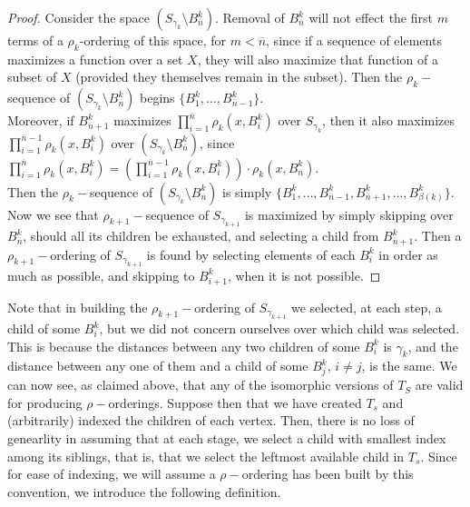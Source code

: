 \begin{proof}
Consider the space $(S_{\gamma_k} \setminus B^k_{\overline{n}})$. Removal of $B^k_{\overline{n}}$ will not effect the first $m$ terms of a $\rho_k$-ordering of this space, for $m < \overline{n}$, since if a sequence of elements maximizes a function over a set $X$, they will also maximize that function of a subset of $X$ (provided they themselves remain in the subset). Then the $\rho_k-$sequence of $(S_{\gamma_k} \setminus B^k_{\overline{n}})$ begins $\{B^k_1,\ldots, B^k_{\overline{n}-1}\}$.\\

Moreover, if $B^k_{\overline{n}+1}$ maximizes $\prod^{\overline{n}}_{i=1} \rho_{k}(x, B^k_i)$ over $S_{\gamma_k}$, then it also maximizes $\prod^{\overline{n}-1}_{i=1} \rho_{k}(x, B^k_i)$ over $(S_{\gamma_k} \setminus B^k_{\overline{n}})$, since $\prod^{\overline{n}}_{i=1} \rho_{k}(x, B^k_i) = (\prod^{\overline{n}-1}_{i=1} \rho_{k}(x, B^k_i)) \cdot \rho_{k}(x, B^k_{\overline{n}})$.\\

Then the $\rho_k-$sequence of  $(S_{\gamma_k}\setminus B^k_{\overline{n}})$ is simply $\{B^k_1,\ldots, B^k_{\overline{n}-1}, B^k_{\overline{n}+1},\ldots, B^k_{\beta(k)}\}$.\\

Now we see that $\rho_{k+1}-$sequence of $S_{\gamma_{k+1}}$ is maximized by simply skipping over $B^k_{\overline{n}}$, should all its children be exhausted, and selecting a child from $B^k_{\overline{n}+1}$. Then a $\rho_{k+1}-$ordering of $S_{\gamma_{k+1}}$ is found by selecting elements of each $B^k_i$ in order as much as possible, and skipping to $B^k_{i+1}$, when it is not possible.

\end{proof}
Note that in building the $\rho_{k+1}-$ordering of $S_{\gamma_{k+1}}$ we selected, at each step, a child of some $B^k_i$, but we did not concern ourselves over which child was selected. This is because the distances between any two children of some $B^k_i$  is $\gamma_k$, and the distance between any one of them and a child of some $B^k_j$, $i \neq j$, is the same. We can now see, as claimed above, that any of the isomorphic versions of $T_ S$ are valid for producing $\rho-$orderings. Suppose then that we have created $T_s$ and (arbitrarily) indexed the children of each vertex. Then, there is no loss of genearlity in assuming that at each stage, we select a child with smallest index among its siblings, that is, that we select the leftmost available child in $T_s$. Since for ease of indexing, we will assume a $\rho-$ordering has been built by this convention, we introduce the following definition.


